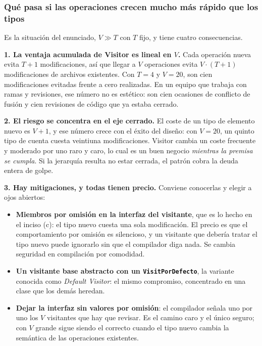 \subsubsection*{Qué pasa si las operaciones crecen mucho más rápido que los tipos}

Es la situación del enunciado, $V \gg T$ con $T$ fijo, y tiene cuatro consecuencias.

\textbf{1. La ventaja acumulada de Visitor es lineal en $V$.} Cada operación nueva evita
$T+1$ modificaciones, así que llegar a $V$ operaciones evita $V \cdot (T+1)$ modificaciones de
archivos existentes. Con $T = 4$ y $V = 20$, son cien modificaciones evitadas frente a cero
realizadas. En un equipo que trabaja con ramas y revisiones, ese número no es estético: son
cien ocasiones de conflicto de fusión y cien revisiones de código que ya estaba cerrado.

\textbf{2. El riesgo se concentra en el eje cerrado.} El coste de un tipo de elemento nuevo es
$V+1$, y ese número crece con el éxito del diseño: con $V = 20$, un quinto tipo de cuenta
cuesta veintiuna modificaciones. Visitor cambia un coste frecuente y moderado por uno raro y
caro, lo cual es un buen negocio \emph{mientras la premisa se cumpla}. Si la jerarquía resulta
no estar cerrada, el patrón cobra la deuda entera de golpe.

\textbf{3. Hay mitigaciones, y todas tienen precio.} Conviene conocerlas y elegir a ojos
abiertos:

\begin{itemize}[leftmargin=1.2cm]
    \item \textbf{Miembros por omisión en la interfaz del visitante}, que es lo hecho en
          el inciso (c): el tipo nuevo cuesta una sola modificación. El precio es que el
          comportamiento por omisión es silencioso, y un visitante que debería tratar el tipo
          nuevo puede ignorarlo sin que el compilador diga nada. Se cambia seguridad en
          compilación por comodidad.
    \item \textbf{Un visitante base abstracto con un \texttt{VisitPorDefecto}}, la variante
          conocida como \textit{Default Visitor}: el mismo compromiso, concentrado en una
          clase que los demás heredan.
    \item \textbf{Dejar la interfaz sin valores por omisión}: el compilador señala uno por uno
          los $V$ visitantes que hay que revisar. Es el camino caro y el único seguro; con $V$
          grande sigue siendo el correcto cuando el tipo nuevo cambia la semántica de las
          operaciones existentes.
\end{itemize}

